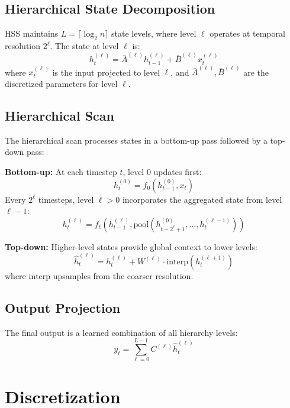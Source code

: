 \documentclass[10pt,twocolumn]{IEEEtran}
\begin{document}
\subsection{Hierarchical State Decomposition}

HSS maintains $L = \lceil \log_2 n \rceil$ state levels, where
level $\ell$ operates at temporal resolution $2^\ell$. The state
at level $\ell$ is:
\begin{equation}
h_t^{(\ell)} = \bar{A}^{(\ell)} h_{t-1}^{(\ell)} +
\bar{B}^{(\ell)} x_t^{(\ell)}
\end{equation}
where $x_t^{(\ell)}$ is the input projected to level $\ell$,
and $\bar{A}^{(\ell)}, \bar{B}^{(\ell)}$ are the discretized
parameters for level $\ell$.

\subsection{Hierarchical Scan}

The hierarchical scan processes states in a bottom-up pass
followed by a top-down pass:

\textbf{Bottom-up:} At each timestep $t$, level 0 updates first:
\begin{equation}
h_t^{(0)} = f_0(h_{t-1}^{(0)}, x_t)
\end{equation}
Every $2^\ell$ timesteps, level $\ell > 0$ incorporates the
aggregated state from level $\ell-1$:
\begin{equation}
h_t^{(\ell)} = f_\ell(h_{t-1}^{(\ell)}, \text{pool}(h_{t-2^\ell+1}^{(0)}, \dots, h_t^{(\ell-1)}))
\end{equation}

\textbf{Top-down:} Higher-level states provide global context
to lower levels:
\begin{equation}
\hat{h}_t^{(\ell)} = h_t^{(\ell)} + W^{(\ell)} \cdot \text{interp}(h_t^{(\ell+1)})
\end{equation}
where $\text{interp}$ upsamples from the coarser resolution.

\subsection{Output Projection}

The final output is a learned combination of all hierarchy levels:
\begin{equation}
y_t = \sum_{\ell=0}^{L-1} C^{(\ell)} \hat{h}_t^{(\ell)}
\end{equation}

\section{Discretization}
\end{document}
